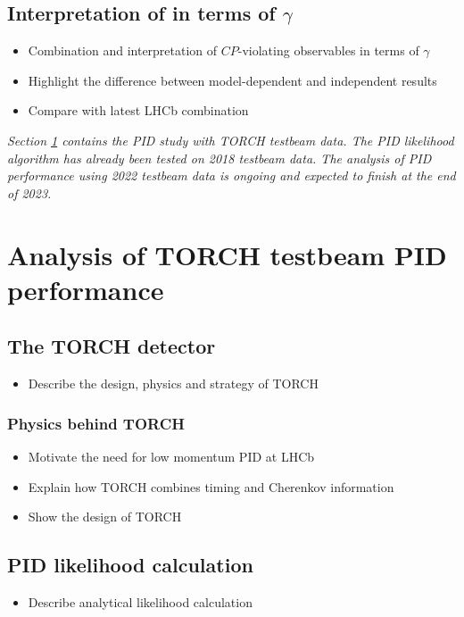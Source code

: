 \documentclass[12pt, a4paper, notitlepage, onecolumn]{article}
\begin{document}
\subsection{Interpretation of in terms of \texorpdfstring{$\gamma$}{gamma}}
  \begin{itemize}[nosep]
    \setlength{\itemindent}{2em}
    \item[\textendash]{Combination and interpretation of $C\!P$-violating observables in terms of $\gamma$}
    \item[\textendash]{Highlight the difference between model-dependent and independent results}
    \item[\textendash]{Compare with latest LHCb combination}
  \end{itemize}
\leavevmode\newline
\noindent\textit{Section \ref{section_Analysis_of_TORCH_testbeam_PID_performance} contains the PID study with TORCH testbeam data. The PID likelihood algorithm has already been tested on 2018 testbeam data. The analysis of PID performance using 2022 testbeam data is ongoing and expected to finish at the end of 2023.}
\section{Analysis of TORCH testbeam PID performance}
\label{section_Analysis_of_TORCH_testbeam_PID_performance}
\subsection{The TORCH detector}
  \begin{itemize}[nosep]
    \setlength{\itemindent}{2em}
    \item[\textendash]{Describe the design, physics and strategy of TORCH}
  \end{itemize}
\subsubsection{Physics behind TORCH}
  \begin{itemize}[nosep]
    \setlength{\itemindent}{2.5em}
    \item[\textasteriskcentered]{Motivate the need for low momentum PID at LHCb}
    \item[\textasteriskcentered]{Explain how TORCH combines timing and Cherenkov information}
    \item[\textasteriskcentered]{Show the design of TORCH}
  \end{itemize}
\subsection{PID likelihood calculation}
  \begin{itemize}[nosep]
    \setlength{\itemindent}{2em}
    \item[\textendash]{Describe analytical likelihood calculation}
  \end{itemize}
\end{document}
